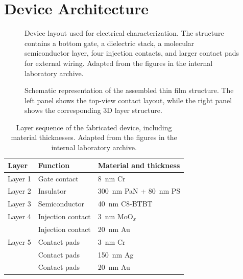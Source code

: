 \section{Device Architecture}

\begin{figure}[htbp]
    \centering
    \resizebox{0.55\linewidth}{!}{}
\caption[Device layout for electrical characterization]{Device layout used for electrical characterization. The structure contains a bottom gate, a dielectric stack, a molecular semiconductor layer, four injection contacts, and larger contact pads for external wiring. Adapted from the figures in the internal laboratory archive.}
    \label{fig:device_architecture}
\end{figure}

\begin{figure}[htbp]
    \centering
    \begin{minipage}{0.45\linewidth}
        \centering
        \resizebox{\linewidth}{!}{}
    \end{minipage}\hfill
    \begin{minipage}{0.50\linewidth}
        \centering
        \resizebox{\linewidth}{!}{}
    \end{minipage}
    \caption[Layer and contact schematic of the thin film structure]{Schematic representation of the assembled thin film structure. The left panel shows the top-view contact layout, while the right panel shows the corresponding 3D layer structure.}
    \label{fig:ofet_layer_schematic}
\end{figure}


\begin{table}[htbp]
    \centering
    \begin{tabular}{|p{1.8cm}|p{3.2cm}|p{5cm}|}
        \hline
        \textbf{Layer} &
        \textbf{Function} &
        \textbf{Material and thickness} \\
        \hline
        Layer 1 & Gate contact & \SI{8}{\nano\meter} Cr\\
        Layer 2 & Insulator & \SI{300}{\nano\meter} PaN + \SI{80}{\nano\meter} PS \\
        Layer 3 & Semiconductor & \SI{40}{\nano\meter} C8-BTBT \\
        Layer 4 & Injection contact & \SI{3}{\nano\meter} MoO$_x$ \\
         & Injection contact & \SI{20}{\nano\meter} Au \\
        Layer 5 & Contact pads & \SI{3}{\nano\meter} Cr  \\
         & Contact pads & \SI{150}{\nano\meter} Ag  \\
         & Contact pads & \SI{20}{\nano\meter} Au \\
        \hline
    \end{tabular}
    \caption[Layer sequence of the fabricated device]{Layer sequence of the fabricated device, including material thicknesses. Adapted from the figures in the internal laboratory archive.}
    \label{tab:device_layer_sequence}
\end{table}

